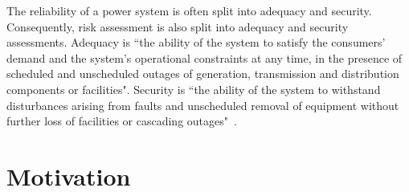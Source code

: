 The reliability of a power system is often split into adequacy and security. Consequently, risk assessment is also split into adequacy and security assessments. %
Adequacy is ``the ability of the system to satisfy the consumers’ demand and the system’s operational constraints at any time, in the presence of scheduled and unscheduled outages of generation, transmission and distribution components or facilities". Security is ``the ability of the system to withstand disturbances arising from faults and unscheduled removal of equipment without further loss of facilities or cascading outages"~\cite{AdequancySecurityDefinition}.



\section{Motivation}

